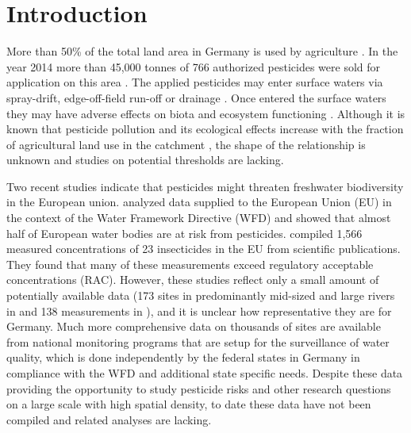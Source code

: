 \documentclass[journal=esthag,manuscript=article]{achemso}
\begin{document}
\section{Introduction}
More than 50\% of the total land area in Germany is used by agriculture \citep{statistisches_bundesamt_bodenflache_2014}.
In the year 2014 more than 45,000 tonnes of 766 authorized pesticides were sold for application on this area \citep{bundesamt_fur_verbraucherschutz_und_lebensmittelsicherheit_absatz_2015}.
The applied pesticides may enter surface waters via spray-drift, edge-off-field run-off or drainage \citep{stehle_probabilistic_2013,schulz_comparison_2001,liess_determination_1999}.
Once entered the surface waters they may have adverse effects on biota and ecosystem functioning \citep{schafer_thresholds_2012}. 
Although it is known that pesticide pollution and its ecological effects increase with the fraction of agricultural land use in the catchment \citep{schulz_field_2004}, the shape of the relationship is unknown and studies on potential thresholds are lacking.

Two recent studies indicate that pesticides might threaten freshwater biodiversity in the European union.
\citet{malaj_organic_2014} analyzed data supplied to the European Union (EU) in the context of the Water Framework Directive (WFD) and showed that almost half of European water bodies are at risk from pesticides.
\citet{stehle_pesticide_2015} compiled 1,566 measured concentrations of 23 insecticides in the EU from scientific publications. 
They found that many of these measurements exceed regulatory acceptable concentrations (RAC).
However, these studies reflect only a small amount of potentially available data (173 sites in predominantly mid-sized and large rivers in \citet{malaj_organic_2014} and 138 measurements in \citet{stehle_pesticide_2015}), and it is unclear how representative they are for Germany. %
Much more comprehensive data on thousands of sites are available from national monitoring programs that are setup for the surveillance of water quality,
which is done independently by the federal states in Germany in compliance with the WFD \citep{quevauviller_water_2008} and additional state specific needs. 
Despite these data providing the opportunity to study pesticide risks and other research questions on a large scale with high spatial density, to date these data have not been compiled and related analyses are lacking. 
\end{document}
